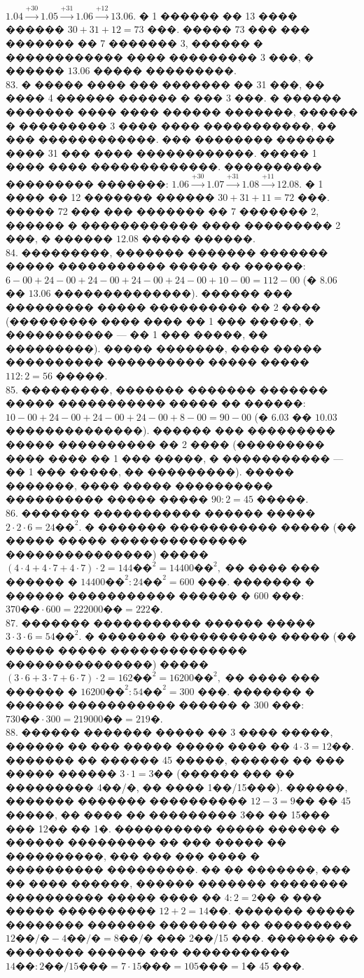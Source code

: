 \documentclass[12pt]{article}
\begin{document}
$1.04\stackrel{+30}{\rightarrow}1.05\stackrel{+31}{\rightarrow}1.06\stackrel{+12}{\rightarrow}13.06.$ � 1 ������ �� 13 ���� ������ $30+31+12=73$ ���. ����� 73 ��� ��� ������� �� 7 ������� 3, ������ � ������������ ���� ��������� 3 ���, � ������ $13.06$ ����� ���������.\\
83. � ����� ���� ��� ������� �� 31 ���, �� ���� 4 ������ ������ � ��� 3 ���. � ������ ������� ���� ���� ������ �������, ������ � ��������� 3 ���� ���� �����������, �� ��� ������������. ��� �������� ������ ���� 31 ��� ���� ������������. ����� 1 ���� ���� �������������. ���������� ��������� �������:
$1.06\stackrel{+30}{\rightarrow}1.07\stackrel{+31}{\rightarrow}1.08\stackrel{+11}{\rightarrow}12.08.$ � 1 ���� �� 12 ������� ������ $30+31+11=72$ ���. ����� 72 ��� ��� ������� �� 7 ������� 2, ������ � ������������ ���� ��������� 2 ���, � ������ $12.08$ ����� ������.\\
84. ���������, ������� ������� ������� ����� ����������� ����� �� ������: $6-00+24-00+24-00+24-00+24-00+10-00=112-00$ (� $8.06$ �� $13.06$ ��������������). ������ ��� ��������� ����� ���������� �� 2 ���� (��������� ���� ���� �� 1 ��� �����, � ����������� --- �� 1 ��� �����, �� ���������). ����� �������, ���� ����� ���������� ���������� ����� ����� $112:2=56$ �����.\\
85. ���������, ������� ������� ������� ����� ����������� ����� �� ������: $10-00+24-00+24-00+24-00+8-00=90-00$ (� $6.03$ �� $10.03$ ��������������). ������ ��� ��������� ����� ���������� �� 2 ���� (��������� ���� ���� �� 1 ��� �����, � ����������� --- �� 1 ��� �����, �� ���������). ����� �������, ���� ����� ���������� ���������� ����� ����� $90:2=45$ �����.\\
86. ������� ����������� ������ ����� $2\cdot2\cdot6=24\text{��}^2.$ � ������� ����������� ����� (�� ����� ����� �������������� ���������������) ����� $(4\cdot4+4\cdot7+4\cdot7)\cdot2=144\text{��}^2=14400\text{��}^2,$ �� ���� ��� ������ � $14400\text{��}^2:24\text{��}^2=600$ ���. ������� � ������ ����������� ������ � 600 ���: $370\text{��}\cdot600=222000\text{��}=222$�.\\
87. ������� ����������� ������ ����� $3\cdot3\cdot6=54\text{��}^2.$ � ������� ����������� ����� (�� ����� ����� �������������� ���������������) ����� $(3\cdot6+3\cdot7+6\cdot7)\cdot2=162\text{��}^2=16200\text{��}^2,$ �� ���� ��� ������ � $16200\text{��}^2:54\text{��}^2=300$ ���. ������� � ������ ����������� ������ � 300 ���: $730\text{��}\cdot300=219000\text{��}=219$�.\\
88. ������ ������� ����� �� 3 ���� �����, ������ �� ��� ����� ����� ���� �� $4\cdot3=12$��. ������� �� ������ 45 �����, ������ �� ��� ����� ������ $3\cdot1=3$�� (������ ��� �� ��������� 4��/�, �� ���� 1��/15���). ������, ������� ������� ���������� $12-3=9$�� �� 45 �����, �� ���� �� ��������� 3�� �� 15��� ��� 12�� �� 1�. ���������� ����� ������ � ������ ��������� �� ��� ����� �� ����������, ��� ��� ��� ���� � ���������� ���������. �� �� �������, ��� �� ���� ������, ������ ������� �������� ���������� ����� ���� �� $4:2=2$�� � ��� ����� ���������� $12+2=14$��. ������� ����� �������� ������� �������� �� ��������� $12\text{��/�}-4\text{��/�}=8\text{��/�}$ ��� 2��/15 ���. ������� �� �������� ������ ��� ����������� $14\text{��}:2\text{��/15���}=7\cdot15\text{���}=105\text{���}=$1� 45 ���.\\
\end{document}

